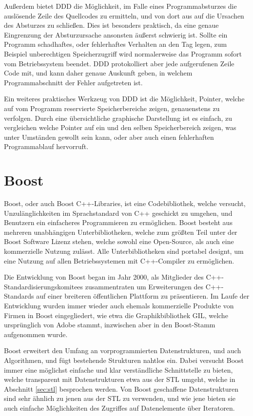 Außerdem bietet DDD die Möglichkeit, im Falle eines Programmabsturzes die auslösende Zeile des Quellcodes zu ermitteln, und von dort aus auf die Ursachen des Absturzes zu schließen. Dies ist besonders
praktisch, da eine genaue Eingrenzung der Absturzursache ansonsten äußerst schwierig ist. Sollte ein Programm schadhaftes, oder fehlerhaftes Verhalten an den Tag legen, zum Beispiel unberechtigen Speicherzugriff
wird normalerweise das Programm sofort vom Betriebssystem beendet. DDD protokolliert aber jede aufgerufenen Zeile Code mit, und kann daher genaue Auskunft geben, in welchem Programmabschnitt der
Fehler aufgetreten ist.

Ein weiteres praktisches Werkzeug von DDD ist die Möglichkeit, Pointer, welche auf vom Programm reservierte Speicherbereiche zeigen, genauenstens zu verfolgen. Durch eine übersichtliche graphische Darstellung
ist es einfach, zu vergleichen welche Pointer auf ein und den selben Speicherbereich zeigen, was unter Umständen gewollt sein kann, oder aber auch einen fehlerhaften Programmablauf hervorruft.

\section{Boost}
Boost, oder auch Boost C++-Libraries, ist eine Codebibliothek, welche versucht, Un\-zu\-läng\-lich\-keiten im Sprachstandard von C++ geschickt zu umgehen, und Benutzern ein einfacheres Programmieren zu ermöglichen.
Boost besteht aus mehreren unabhängigen Unterbibliotheken, welche zum größten Teil unter der Boost Software Lizenz stehen, welche sowohl eine Open-Source, als auch eine kommerzielle Nutzung zulässt. Alle
Unterbibliotheken sind portabel designt, um eine Nutzung auf allen Betriebssystemen mit C++-Compiler zu ermöglichen. 

Die Entwicklung von Boost began im Jahr 2000, als Mitglieder des C++\--Standardisierungs\-komitees zusammentraten um Erweiterungen des C++-Standards auf einer breiteren öffentlichen Plattform zu präsentieren.
Im Laufe der Entwicklung wurden immer wieder auch ehemals kommerzielle Produkte von Firmen in Boost eingegliedert, wie etwa die Graphikbibliothek GIL, welche ursprünglich von Adobe stammt, inzwischen
aber in den Boost-Stamm aufgenommen wurde.

Boost erweitert den Umfang an vorprogrammierten Datenstrukturen, und auch Algorithmen, und fügt bestehende Strukturen nahtlos ein. Dabei versucht Boost immer eine möglichst einfache und klar verständliche
Schnittstelle zu bieten, welche transparent mit Datenstrukturen etwa aus der STL umgeht, welche in Abschnitt \ref{sec:stl} besprochen werden. Von Boost geschaffene Datenstrukturen sind sehr ähnlich zu jenen
aus der STL zu verwenden, und wie jene bieten sie auch einfache Möglichkeiten des Zugriffes auf Datenelemente über Iteratoren. 

